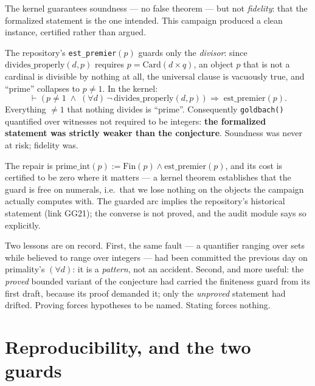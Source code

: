 \documentclass[11pt]{article}
\theoremstyle{remark}\newtheorem{remark}{Remark}
\begin{document}
The kernel guarantees soundness --- no false theorem --- but not \emph{fidelity}: that
the formalized statement is the one intended. This campaign produced a clean instance,
certified rather than argued.

The repository's \texttt{est\_premier}$(p)$ guards only the \emph{divisor}: since
$\mathrm{divides\_properly}(d,p)$ requires $p = \mathrm{Card}(d \times q)$, an object $p$
that is not a cardinal is divisible by nothing at all, the universal clause is vacuously
true, and ``prime'' collapses to $p \neq 1$. In the kernel:
\[
\vdash\;\bigl(\,p \neq 1 \;\wedge\; (\forall d)\,\neg\,\mathrm{divides\_properly}(d,p)\,\bigr)
\;\Longrightarrow\; \mathrm{est\_premier}(p).
\]
Everything $\neq 1$ that nothing divides is ``prime''. Consequently \texttt{goldbach()}
quantified over witnesses not required to be integers: \textbf{the formalized statement
was strictly weaker than the conjecture}. Soundness was never at risk; fidelity was.

The repair is $\mathrm{prime\_int}(p) := \mathrm{Fin}(p) \wedge \mathrm{est\_premier}(p)$,
and its cost is certified to be zero where it matters --- a kernel theorem establishes
that the guard is free on numerals, i.e.\ that we lose nothing on the objects the
campaign actually computes with. The guarded arc implies the repository's historical
statement (link GG21); the converse is not proved, and the audit module says so
explicitly.

Two lessons are on record. First, the same fault --- a quantifier ranging over sets while
believed to range over integers --- had been committed the previous day on primality's
$(\forall d)$: it is a \emph{pattern}, not an accident. Second, and more useful: the
\emph{proved} bounded variant of the conjecture had carried the finiteness guard from
its first draft, because its proof demanded it; only the \emph{unproved} statement had
drifted. Proving forces hypotheses to be named. Stating forces nothing.

\section{Reproducibility, and the two guards}
\label{sec:repro}
\end{document}
